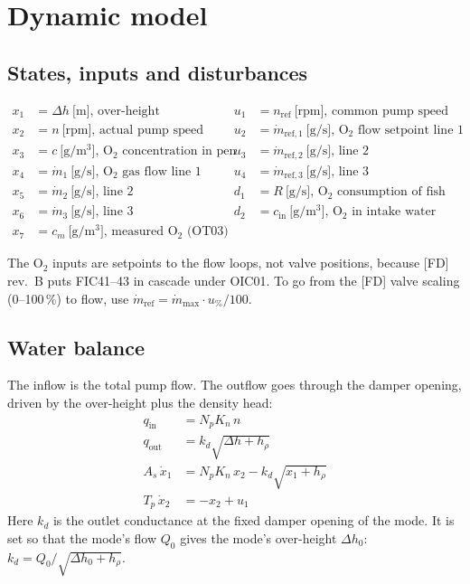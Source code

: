 \documentclass[11pt]{article}
\begin{document}
\section{Dynamic model}\label{sec:model}

\subsection{States, inputs and disturbances}
\begin{align*}
x_1 &= \Delta h \ \text{[m], over-height}                     & u_1 &= n_\text{ref}\ \text{[rpm], common pump speed setpoint}\\
x_2 &= n \ \text{[rpm], actual pump speed}                     & u_2 &= \dot m_{\text{ref},1}\ \text{[g/s], O$_2$ flow setpoint line 1}\\
x_3 &= c \ \text{[g/m$^3$], O$_2$ concentration in pen}         & u_3 &= \dot m_{\text{ref},2}\ \text{[g/s], line 2}\\
x_4 &= \dot m_1 \ \text{[g/s], O$_2$ gas flow line 1}           & u_4 &= \dot m_{\text{ref},3}\ \text{[g/s], line 3}\\
x_5 &= \dot m_2 \ \text{[g/s], line 2}                          & d_1 &= R\ \text{[g/s], O$_2$ consumption of fish}\\
x_6 &= \dot m_3 \ \text{[g/s], line 3}                          & d_2 &= c_\text{in}\ \text{[g/m$^3$], O$_2$ in intake water}\\
x_7 &= c_m \ \text{[g/m$^3$], measured O$_2$ (OT03)}            &     &
\end{align*}

The O$_2$ inputs are setpoints to the flow loops, not valve positions, because [FD] rev.~B puts
FIC41--43 in cascade under OIC01. To go from the [FD] valve scaling (0--100\,\%) to flow, use
$\dot m_\text{ref} = \dot m_\text{max}\cdot u_\%/100$.

\subsection{Water balance}
The inflow is the total pump flow. The outflow goes through the damper opening, driven by the
over-height plus the density head:
\begin{align}
q_\text{in}  &= N_p K_n\, n \\
q_\text{out} &= k_d \sqrt{\Delta h + h_\rho}\\
A_s\,\dot x_1 &= N_p K_n\, x_2 - k_d\sqrt{x_1 + h_\rho} \label{eq:level}\\
T_p\,\dot x_2 &= -x_2 + u_1 \label{eq:pump}
\end{align}
Here $k_d$ is the outlet conductance at the fixed damper opening of the mode. It is set so that
the mode's flow $Q_0$ gives the mode's over-height $\Delta h_0$:
$k_d = Q_0/\sqrt{\Delta h_0+h_\rho}$.
\end{document}
